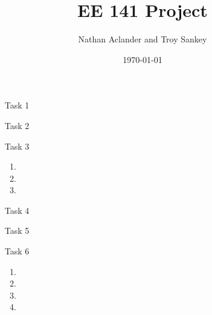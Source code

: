 \documentclass{article}
\title{EE 141 Project}
\date{\today}
\author{Nathan Aclander and Troy Sankey}
\begin{document}
\maketitle
\newpage

\begin{itemize}

\item[Task 1]
\item[Task 2]
\item[Task 3]

  \begin{enumerate}[A]
  \item
  \item
  \item
  \end{enumerate}

\item[Task 4]
\item[Task 5]
\item[Task 6]

  \begin{enumerate}[A]
  \item
  \item
  \item
  \item
  \end{enumerate}

\end{itemize}
\end{document}
